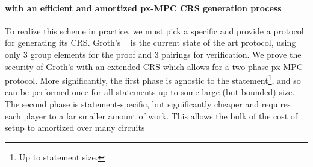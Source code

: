 \documentclass{article}
\begin{document}
\paragraph*{ {\snarks} with an efficient and amortized px-MPC CRS generation process}
To realize this scheme in practice, we must pick a specific  {\snark} and provide a protocol for generating its CRS. Groth's  {\snark}~\cite{Groth16} is the current state of the art protocol, using only 3 group elements for the proof and 3 pairings for verification.  We prove the security of Groth's  {\snark} with an extended CRS which allows for a two phase px-MPC protocol. More significantly, the first phase is agnostic to the statement\footnote{Up to statement size.}, and so can be performed once for all statements up to some large (but bounded) size.  The second phase is statement-specific, but significantly cheaper and requires each player to a far smaller amount of work. This allows the bulk of the cost of setup to amortized over many circuits


\end{document}
